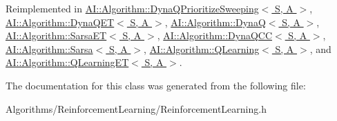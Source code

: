 Reimplemented in \hyperlink{classAI_1_1Algorithm_1_1DynaQPrioritizeSweeping_ad08b55f3cf927189dd31abf9fc1c2959}{A\+I\+::\+Algorithm\+::\+Dyna\+Q\+Prioritize\+Sweeping$<$ S, A $>$}, \hyperlink{classAI_1_1Algorithm_1_1DynaQET_a53b0e06842fbb802acfa5384a84ad448}{A\+I\+::\+Algorithm\+::\+Dyna\+Q\+E\+T$<$ S, A $>$}, \hyperlink{classAI_1_1Algorithm_1_1DynaQ_a4542226b17db4ed8a2c5ec17d37dc42f}{A\+I\+::\+Algorithm\+::\+Dyna\+Q$<$ S, A $>$}, \hyperlink{classAI_1_1Algorithm_1_1SarsaET_adf13376b7ec8fdfa2b19ffadb1aa81e7}{A\+I\+::\+Algorithm\+::\+Sarsa\+E\+T$<$ S, A $>$}, \hyperlink{classAI_1_1Algorithm_1_1DynaQCC_ae23b8f0afbb9fc5024aef9ce720c9b84}{A\+I\+::\+Algorithm\+::\+Dyna\+Q\+C\+C$<$ S, A $>$}, \hyperlink{classAI_1_1Algorithm_1_1Sarsa_ae1d62478d3e31cace3fb594e05f83d1c}{A\+I\+::\+Algorithm\+::\+Sarsa$<$ S, A $>$}, \hyperlink{classAI_1_1Algorithm_1_1QLearning_a042e1987ce21a94f59603c4cb1eeed82}{A\+I\+::\+Algorithm\+::\+Q\+Learning$<$ S, A $>$}, and \hyperlink{classAI_1_1Algorithm_1_1QLearningET_a9a245dcb3ca8f26b37e5a6daa6d4a898}{A\+I\+::\+Algorithm\+::\+Q\+Learning\+E\+T$<$ S, A $>$}.



The documentation for this class was generated from the following file\+:\begin{DoxyCompactItemize}
\item 
Algorithms/\+Reinforcement\+Learning/Reinforcement\+Learning.\+h\end{DoxyCompactItemize}

